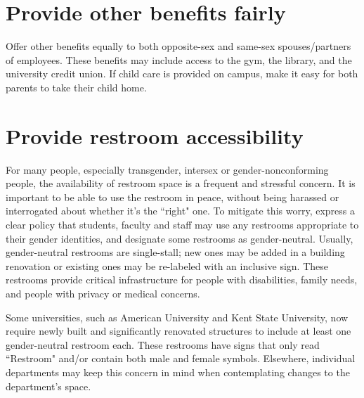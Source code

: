 \section {Provide other benefits fairly}
\label{other-benefits}
Offer other benefits equally to both opposite-sex and same-sex spouses/partners of employees.  These benefits may include access to the gym, the library, and the university credit union.  If child care is provided on campus, make it easy for both parents to take their child home.  


\section {Provide restroom accessibility}
\label{restrooms}
For many people, especially transgender, intersex or gender-nonconforming people, the availability of restroom space is a frequent and stressful concern. It is important to be able to use the restroom in peace, without being harassed or interrogated about whether it's the ``right" one. To mitigate this worry, express a clear policy that students, faculty and staff may use any restrooms appropriate to their gender identities, and designate some restrooms as gender-neutral. Usually, gender-neutral restrooms are single-stall; new ones may be added in a building renovation or existing ones may be re-labeled with an inclusive sign. These restrooms provide critical infrastructure for people with disabilities, family needs, and people with privacy or medical concerns.

Some universities, such as American University and Kent State University, now require newly built and significantly renovated structures to include at least one gender-neutral restroom each. These restrooms have signs that only read ``Restroom" and/or contain both male and female symbols. Elsewhere, individual departments may keep this concern in mind when contemplating changes to the department's space.

